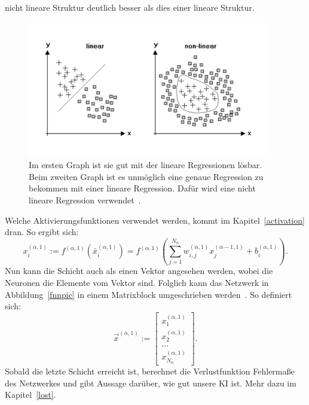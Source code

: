 \documentclass[11pt]{article}
\begin{document}
nicht lineare Struktur deutlich besser als dies einer lineare Struktur.
\begin{figure}[h]
    \centering
    \includegraphics[width=300pt, keepaspectratio]{images/regression}
    \caption[Lineare Regression und nicht lineare Regression~\cite{6}]{Im ersten Graph ist sie gut mit der lineare Regressionen lösbar. Beim zweiten Graph ist es
    unmöglich eine genaue Regression zu bekommen mit einer lineare Regression. Dafür wird eine nicht lineare Regression verwendet~\cite{6}.}\label{regressionpic}
\end{figure}
Welche Aktivierungsfunktionen verwendet werden, kommt im Kapitel~\ref{activation} dran. So ergibt sich:
\begin{equation}
    x_{i}^{(\alpha,1)} := f^{(\alpha,1)}(\bar{x}_{i}^{(\alpha,1)}) = f^{(\alpha,1)}(\sum_{j=1}^{N_{\alpha}} w_{i,j}^{(\alpha,1)} x_{j}^{(\alpha-1,1)} + b_{i}^{(\alpha,1)}).
\end{equation}
Nun kann die Schicht auch als einen Vektor angesehen werden, wobei die Neuronen die Elemente vom Vektor sind. Folglich kann das Netzwerk
in Abbildung~\ref{fnnpic} in einem Matrixblock umgeschrieben werden~\cite{13}. So definiert sich:
\begin{equation}\label{withfunction}
    \vec{x}^{(\alpha,1)} := \begin{bmatrix}x_{1}^{(\alpha,1)} \\ x_{2}^{(\alpha,1)} \\ \ldots \\ x_{N_{\alpha}}^{(\alpha,1)} \end{bmatrix}.
\end{equation}
Sobald die letzte Schicht erreicht ist, berechnet die Verlustfunktion Fehlermaße des Netzwerkes und gibt Aussage darüber, wie gut
unsere KI ist. Mehr dazu im Kapitel~\ref{lost}.
\end{document}
